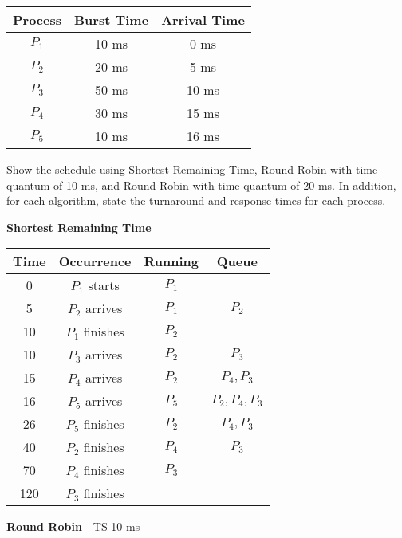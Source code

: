 \documentclass[11pt,largemargins]{homework}
\begin{document}
\begin{center}
\begin{tabular}{|c|c|c|}\hline
    \textbf{Process} & \textbf{Burst Time} & \textbf{Arrival Time} \\\hline
    $P_1$ & 10 ms & 0 ms \\\hline
    $P_2$ & 20 ms & 5 ms \\\hline
    $P_3$ & 50 ms & 10 ms \\\hline
    $P_4$ & 30 ms & 15 ms \\\hline
    $P_5$ & 10 ms & 16 ms \\\hline
\end{tabular}
\end{center}
Show the schedule using Shortest Remaining Time, Round Robin with time quantum
of 10 ms, and Round Robin with time quantum of 20 ms. In addition, for each
algorithm, state the turnaround and response times for each process.


\textbf{Shortest Remaining Time}

\begin{tabular}{|c|c|c|c|}\hline
    \textbf{Time} & \textbf{Occurrence} & \textbf{Running} & \textbf{Queue} \\\hline
    0 & $P_1$ starts & $P_1$ & \\\hline
    5 & $P_2$ arrives & $P_1$ & $P_2$ \\\hline
    10 & $P_1$ finishes & $P_2$ & \\\hline
    10 & $P_3$ arrives & $P_2$ & $P_3$ \\\hline
    15 & $P_4$ arrives & $P_2$ & $P_4, P_3$ \\\hline
    16 & $P_5$ arrives & $P_5$ & $P_2, P_4, P_3$ \\\hline
    26 & $P_5$ finishes & $P_2$ & $P_4, P_3$ \\\hline
    40 & $P_2$ finishes & $P_4$ & $P_3$ \\\hline
    70 & $P_4$ finishes & $P_3$ & \\\hline
    120 & $P_3$ finishes & & \\\hline
\end{tabular}

\clearpage
\textbf{Round Robin} - TS 10 ms
\end{document}
